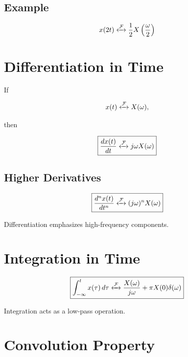 
\subsection{Example}

\[
x(2t)
\xleftrightarrow{\mathcal{F}}
\frac{1}{2}X\left(\frac{\omega}{2}\right)
\]


\section{Differentiation in Time}

If

\[
x(t)\xleftrightarrow{\mathcal{F}}X(\omega),
\]

then

\[
\boxed{
\frac{dx(t)}{dt}
\xleftrightarrow{\mathcal{F}}
j\omega X(\omega)
}
\]


\subsection{Higher Derivatives}

\[
\boxed{
\frac{d^n x(t)}{dt^n}
\xleftrightarrow{\mathcal{F}}
(j\omega)^nX(\omega)
}
\]

Differentiation emphasizes high-frequency components.


\section{Integration in Time}

\[
\boxed{
\int_{-\infty}^{t}x(\tau)\,d\tau
\xleftrightarrow{\mathcal{F}}
\frac{X(\omega)}{j\omega}+\pi X(0)\delta(\omega)
}
\]

Integration acts as a low-pass operation.


\section{Convolution Property}

